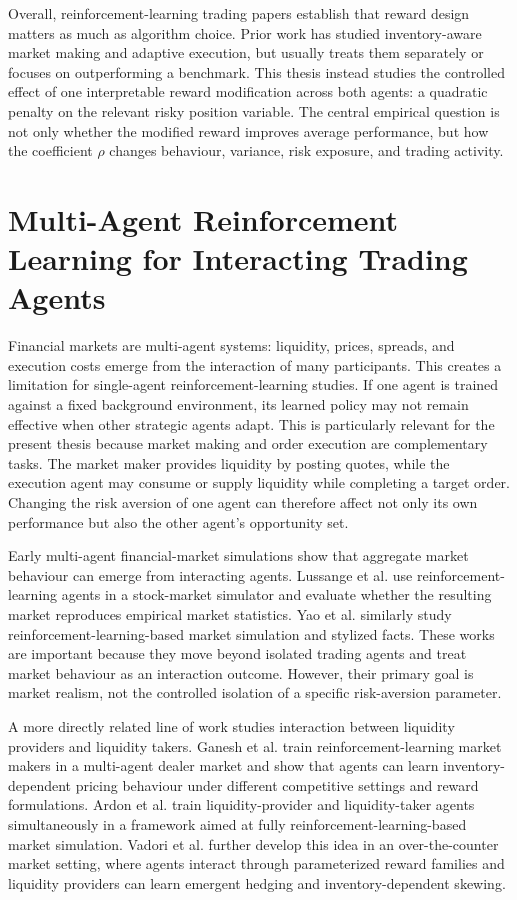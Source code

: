 \documentclass[oneside]{uva-inf-bachelor-thesis}
\begin{document}
Overall, reinforcement-learning trading papers establish that reward design matters as much as algorithm choice. Prior work has studied inventory-aware market making and adaptive execution, but usually treats them separately or focuses on outperforming a benchmark. This thesis instead studies the controlled effect of one interpretable reward modification across both agents: a quadratic penalty on the relevant risky position variable. The central empirical question is not only whether the modified reward improves average performance, but how the coefficient \(\rho\) changes behaviour, variance, risk exposure, and trading activity.

\section{Multi-Agent Reinforcement Learning for Interacting Trading Agents}

Financial markets are multi-agent systems: liquidity, prices, spreads, and execution costs emerge from the interaction of many participants. This creates a limitation for single-agent reinforcement-learning studies. If one agent is trained against a fixed background environment, its learned policy may not remain effective when other strategic agents adapt. This is particularly relevant for the present thesis because market making and order execution are complementary tasks. The market maker provides liquidity by posting quotes, while the execution agent may consume or supply liquidity while completing a target order. Changing the risk aversion of one agent can therefore affect not only its own performance but also the other agent's opportunity set.

Early multi-agent financial-market simulations show that aggregate market behaviour can emerge from interacting agents. Lussange et al. \cite{lussange_modelling_2021} use reinforcement-learning agents in a stock-market simulator and evaluate whether the resulting market reproduces empirical market statistics. Yao et al. \cite{yao_reinforcement_2024} similarly study reinforcement-learning-based market simulation and stylized facts. These works are important because they move beyond isolated trading agents and treat market behaviour as an interaction outcome. However, their primary goal is market realism, not the controlled isolation of a specific risk-aversion parameter.

A more directly related line of work studies interaction between liquidity providers and liquidity takers. Ganesh et al. \cite{ganesh_reinforcement_2019} train reinforcement-learning market makers in a multi-agent dealer market and show that agents can learn inventory-dependent pricing behaviour under different competitive settings and reward formulations. Ardon et al. \cite{ardon_towards_2021} train liquidity-provider and liquidity-taker agents simultaneously in a framework aimed at fully reinforcement-learning-based market simulation. Vadori et al. \cite{vadori_towards_2023} further develop this idea in an over-the-counter market setting, where agents interact through parameterized reward families and liquidity providers can learn emergent hedging and inventory-dependent skewing.
\end{document}
